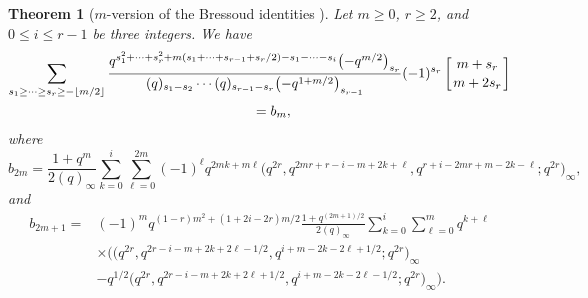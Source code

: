 \documentclass[pdftex]{sigma}
\numberwithin{equation}{section}
\newtheorem{Theorem}{Theorem}[section]
\begin{document}
\begin{Theorem}[$m$-version of the Bressoud identities {\cite[equation~(3.7)]{Br80}}]\label{thm:mbr-3.7}
Let $m\geq 0$, $r \geq 2$, and $0 \leq i \leq r-1$ be three integers. We have
\begin{gather}
\sum_{s_1\geq\dots\geq s_{r}\geq-\left\lfloor m/2\right\rfloor}\frac{q^{s_1^2+\dots+s_{r}^2+m(s_1+\dots+s_{r-1}+s_r/2)-s_1-\dots-s_{i}}\bigl(-q^{m/2}\bigr)_{s_r}}{(q)_{s_1-s_2} \cdots(q)_{s_{r-1}-s_{r}}\bigl(-q^{1+m/2}\bigr)_{s_{r-1}}}(-1)^{s_r}\left[{m+s_r\atop m+2s_r}\right]\nonumber\\
\qquad=b_m,\label{mbr-3.7}
\end{gather}
where
\begin{equation*}
b_{2m}=\frac{1+q^m}{2(q)_\infty}\sum_{k=0}^{i}\sum_{\ell=0}^{2m}(-1)^\ell q^{2mk+m\ell}\bigl(q^{2r},q^{2mr+r-i-m+2k+\ell},q^{r+i-2mr+m-2k-\ell};q^{2r}\bigr)_\infty,
\end{equation*}
and
\begin{align*}
b_{2m+1}={}&(-1)^mq^{(1-r)m^2+(1+2i-2r)m/2 }\frac{1+q^{(2m+1)/2}}{2(q)_\infty}\sum_{k=0}^i\sum_{\ell=0}^mq^{k+\ell}\\
&\times\bigl(\bigl(q^{2r},q^{2r-i-m+2k+2\ell-1/2},q^{i+m-2k-2\ell+1/2};q^{2r}\bigr)_\infty\\
&- q^{1/2}\bigl(q^{2r},q^{2r-i-m+2k+2\ell+1/2},q^{i+m-2k-2\ell-1/2};q^{2r}\bigr)_\infty\bigr).
\end{align*}
\end{Theorem}
\end{document}
